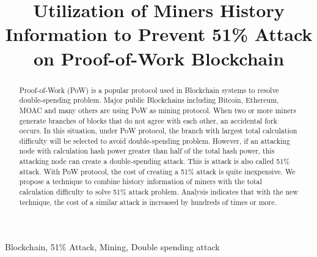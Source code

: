 \documentclass[conference]{IEEEtran}
\begin{document}
\title{Utilization of Miners History Information to Prevent 51\% Attack on Proof-of-Work Blockchain\\
}

\author{
\and
{}
\and
{}
}

\maketitle

\begin{abstract}
Proof-of-Work (PoW) is a popular protocol used in Blockchain systems to resolve double-spending problem. Major public Blockchains including Bitcoin, Ethereum, MOAC and many others are using PoW as mining protocol. When two or more miners generate branches of blocks that do not agree with each other, an accidental fork occurs. In this situation, under PoW protocol, the branch with largest total calculation difficulty will be selected to avoid double-spending problem. However, if an attacking node with calculation hash power greater than half of the total hash power, this attacking node can create a double-spending attack. This is attack is also called 51\% attack. With PoW protocol, the cost of creating a 51\% attack is quite inexpensive. We propose a technique to combine history information of miners with the total calculation difficulty to solve 51\% attack problem. Analysis indicates that with the new technique, the cost of a similar attack is increased by hundreds of times or more.
\end{abstract}

\begin{IEEEkeywords}
Blockchain, 51\% Attack, Mining, Double spending attack
\end{IEEEkeywords}
\end{document}
